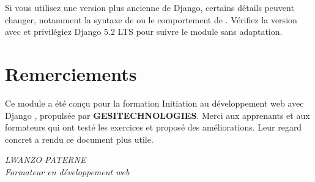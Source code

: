 \begin{attention}
Si vous utilisez une version plus ancienne de Django, certains détails peuvent
changer, notamment la syntaxe de  ou le comportement de
. Vérifiez la version avec  et
privilégiez Django 5.2 LTS pour suivre le module sans adaptation.
\end{attention}

\section*{Remerciements}

Ce module a été conçu pour la formation \og Initiation au développement web avec
Django \fg, propulsée par \textbf{GESITECHNOLOGIES}. Merci aux apprenants et aux
formateurs qui ont testé les exercices et proposé des améliorations. Leur regard
concret a rendu ce document plus utile.

\vspace{1cm}
\begin{flushright}
\textit{LWANZO PATERNE}\\
\textit{Formateur en développement web}
\end{flushright}
